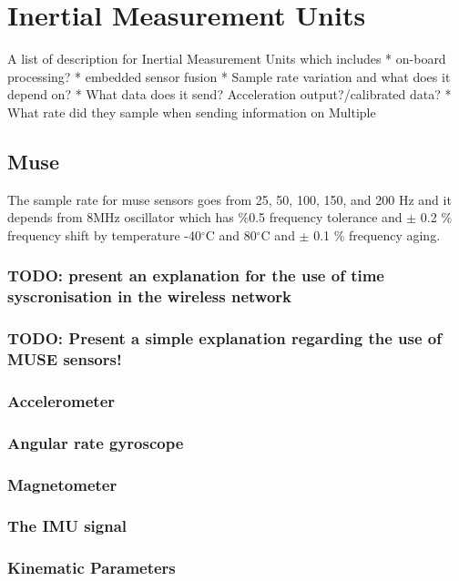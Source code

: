 \chapter{Inertial Measurement Units}



A list of description for Inertial Measurement Units which includes
* on-board processing?
* embedded sensor fusion
* Sample rate variation and what does it depend on?
* What data does it send? Acceleration output?/calibrated data?
* What rate did they sample when sending information on Multiple



\section{Muse}
The sample rate for muse sensors goes from 25, 50, 100, 150, and 200 Hz and it
depends from 8MHz oscillator which has \%0.5 frequency tolerance and
$\pm$ 0.2 \% frequency shift by temperature -40$^{\circ}$C and 80$^{\circ}$C
and $\pm$ 0.1 \% frequency aging.

\subsection{TODO: present an explanation for the use of time syscronisation in the
wireless network}

\subsection{TODO: Present a simple explanation regarding the use of MUSE sensors!}

\subsection{Accelerometer}
\subsection{Angular rate gyroscope}
\subsection{Magnetometer}
\subsection{The IMU signal}
\subsection{Kinematic Parameters}

